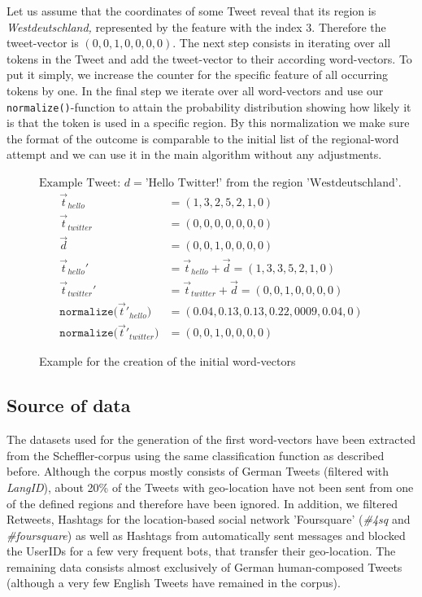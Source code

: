 \documentclass[./Main.tex]{subfiles}
\begin{document}
Let us assume that the coordinates of some Tweet reveal that its region is \textit{Westdeutschland,} represented by the feature with the index $3$.
Therefore the tweet-vector is $(0,0,1,0,0,0,0)$. 
The next step consists in iterating over all tokens in the Tweet and add the tweet-vector to their according word-vectors. To put it simply, we increase the counter for the specific feature of all occurring tokens by one. 
In the final step we iterate over all word-vectors and use our \texttt{normalize()}-function to attain the probability distribution showing how likely it is that the token is used in a specific region. By this normalization we make sure the format of the outcome is comparable to the initial list of the regional-word attempt and we can use it in the main algorithm without any adjustments.

\begin{figure}
\centering $\textrm{Example Tweet: } d = \textrm{'Hello Twitter!'} \textrm{ from the region 'Westdeutschland'.}$
 \begin{align*}
    \vec{t}_{hello} &= (1,3,2,5,2,1,0) \\
     \vec{t}_{twitter} &= (0,0,0,0,0,0,0) \\
      \vec{d} &= (0,0,1,0,0,0,0) \\
     \vec{t}_{hello}' &= \vec{t}_{hello} + \vec{d} =  (1,3,3,5,2,1,0) \\
    \vec{t}_{twitter} ' &= \vec{t}_{twitter} + \vec{d} = (0,0,1,0,0,0,0) \\
     \texttt{normalize(}\vec{t}'_{hello}\texttt{)} &= (0.04, 0.13, 0.13, 0.22, 0009, 0.04, 0) \\
     \texttt{normalize(}\vec{t}'_{twitter}\texttt{)} &= (0,0,1,0,0,0,0)
  \end{align*}
  \caption{Example for the creation of the initial word-vectors}
  \label{geo_example1}
\end{figure}

\subsection{Source of data}
The datasets used for the generation of the first word-vectors have been extracted from the Scheffler-corpus using the same classification function as described before. Although the corpus mostly consists of German Tweets (filtered with \emph{LangID}), about 20\% of the Tweets with geo-location have not been sent from one of the defined regions and therefore have been ignored. In addition, we filtered Retweets, Hashtags for the location-based social network 'Foursquare' (\emph{\#4sq} and \emph{\#foursquare}) as well as Hashtags from automatically sent messages and blocked the UserIDs for a few very frequent bots, that transfer their geo-location. The remaining data consists almost exclusively of German human-composed Tweets (although a very few English Tweets have remained in the corpus).
\end{document}
